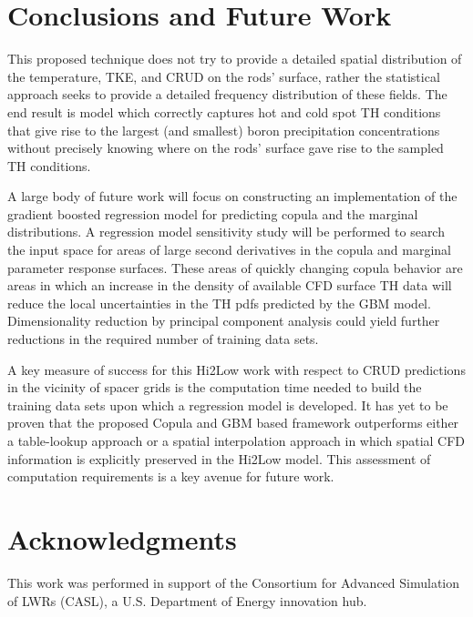 \documentclass{anstrans}
\begin{document}
\section{Conclusions and Future Work}

This proposed technique does not try to provide a detailed spatial distribution
of the temperature, TKE, and CRUD on the rods' surface, rather the
statistical approach seeks to provide a detailed frequency distribution
of these fields.  The end result is model which correctly captures hot and cold
spot TH conditions that give rise to the largest (and smallest) boron
precipitation concentrations without precisely knowing where on the rods'
surface gave rise to the sampled TH conditions.

A large body of future work will focus on constructing an implementation of the gradient boosted regression model
for predicting copula and the marginal distributions.  A regression model sensitivity study will be performed to search the input space for areas of large second derivatives in the copula and marginal parameter response surfaces.  These areas of quickly changing copula behavior are areas in which an increase in the density of available CFD surface TH data will reduce the local uncertainties in the TH pdfs predicted by the GBM model.  Dimensionality reduction by principal component analysis could yield further reductions in the required number of training data sets. 

A key measure of success for this Hi2Low work with respect to  CRUD predictions
in the vicinity of spacer grids is the computation time needed to build the
training data sets upon which a regression model is developed.
It has yet to be proven that the proposed Copula and GBM based framework outperforms
either a table-lookup approach or a spatial interpolation approach in which
spatial CFD information is explicitly preserved in the Hi2Low model.  This assessment
of computation requirements is a key avenue for future work.

\section{Acknowledgments} This work was performed in support of the
Consortium for Advanced Simulation of LWRs (CASL), a U.S. Department of Energy innovation hub.

  
\end{document}
